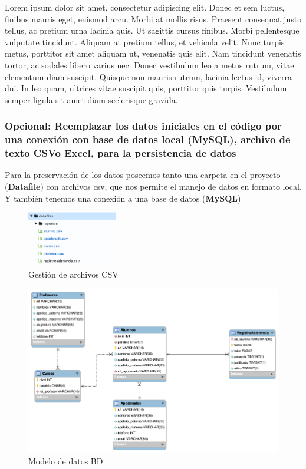 Lorem ipsum dolor sit amet, consectetur adipiscing elit. Donec et sem luctus, finibus mauris eget, euismod arcu. Morbi at mollis risus. Praesent consequat justo tellus, ac pretium urna lacinia quis. Ut sagittis cursus finibus. Morbi pellentesque vulputate tincidunt. Aliquam at pretium tellus, et vehicula velit. Nunc turpis metus, porttitor sit amet aliquam ut, venenatis quis elit. Nam tincidunt venenatis tortor, ac sodales libero varius nec. Donec vestibulum leo a metus rutrum, vitae elementum diam suscipit. Quisque non mauris rutrum, lacinia lectus id, viverra dui. In leo quam, ultrices vitae suscipit quis, porttitor quis turpis. Vestibulum semper ligula sit amet diam scelerisque gravida.

\subsubsection*{Opcional: Reemplazar los datos iniciales en el código por una conexión con base de datos local (MySQL), archivo de texto CSVo Excel, para la persistencia de datos}

Para la preservación de los datos poseemos tanto una carpeta en el proyecto (\textbf{Datafile}) con archivos csv, que nos permite el manejo de datos en formato local. Y también tenemos una conexión a una base de datos (\textbf{MySQL})

\begin{figure}[h]
    \centering
    \includegraphics[width=0.35\textwidth]{contents/img/img12}
    \caption{Gestión de archivos CSV}
    \label{fig:img12}
\end{figure}

\clearpage

\begin{figure}[h]
    \centering
    \includegraphics[width=1\textwidth]{contents/img/img13}
    \caption{Modelo de datos BD}
    \label{fig:img13}
\end{figure}

